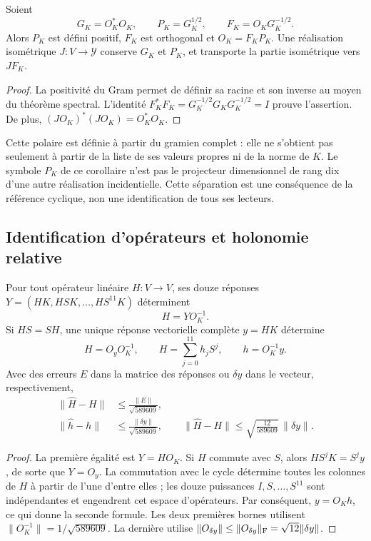 \begin{corollary}
\label{md:antmem:k:polar}
Soient
\[
 G_K=O_K^*O_K,\qquad P_K=G_K^{1/2},\qquad
 F_K=O_KG_K^{-1/2}.
\]
Alors \(P_K\) est défini positif, \(F_K\) est orthogonal et
\(O_K=F_KP_K\). Une réalisation isométrique \(J:V\to\mathcal Y\)
conserve \(G_K\) et \(P_K\), et transporte la partie isométrique vers
\(JF_K\).
\end{corollary}
\begin{proof}
La positivité du Gram permet de définir sa racine et son inverse au moyen du
théorème spectral. L’identité
\(F_K^*F_K=G_K^{-1/2}G_KG_K^{-1/2}=I\) prouve l’assertion.
De plus, \((JO_K)^*(JO_K)=O_K^*O_K\).
\end{proof}

Cette polaire est définie à partir du gramien complet : elle ne s’obtient pas seulement à partir de la
liste de ses valeurs propres ni de la norme de \(K\). Le symbole
\(P_K\) de ce corollaire n’est pas le projecteur dimensionnel de rang dix
d’une autre réalisation incidentielle. Cette séparation est une conséquence de la
référence cyclique, non une identification de tous ses lecteurs.

\subsection{Identification d'opérateurs et holonomie relative}
\label{md:antmem:k:identificacion}

\begin{theorem}
\label{md:antmem:k:operadores}
Pour tout opérateur linéaire \(H:V\to V\), ses douze réponses \(Y=(HK,HSK,\ldots,HS^{11}K)\) déterminent
\[
 H=YO_K^{-1}.
\]
Si \(HS=SH\), une unique réponse vectorielle complète \(y=HK\) détermine
\begin{equation}
 H=O_yO_K^{-1},\qquad
 H=\sum_{j=0}^{11}h_jS^j,\qquad h=O_K^{-1}y.
 \label{md:antmem:k:filtro}
\end{equation}
Avec des erreurs \(E\) dans la matrice des réponses ou \(\delta y\) dans le
vecteur, respectivement,
\begin{align}
 \|\widehat H-H\|&\leq\frac{\|E\|}{\sqrt{589609}},
 \label{md:antmem:k:error-matriz}\\
 \|\widehat h-h\|&\leq\frac{\|\delta y\|}{\sqrt{589609}},\qquad
 \|\widehat H-H\|\leq\sqrt{\frac{12}{589609}}\,\|\delta y\|.
 \label{md:antmem:k:error-filtro}
\end{align}
\end{theorem}
\begin{proof}
La première égalité est \(Y=HO_K\). Si \(H\) commute avec \(S\), alors \(HS^jK=S^jy\), de sorte que \(Y=O_y\). La commutation avec le cycle détermine toutes les colonnes de \(H\) à partir de l'une d'entre elles ; les douze puissances \(I,S,\ldots,S^{11}\) sont indépendantes et engendrent cet espace d'opérateurs. Par conséquent, \(y=O_Kh\), ce qui donne la seconde formule. Les deux premières bornes utilisent \(\|O_K^{-1}\|=1/\sqrt{589609}\). La dernière utilise \(\|O_{\delta y}\|\leq\|O_{\delta y}\|_{\rm F}
=\sqrt{12}\|\delta y\|\).
\end{proof}

